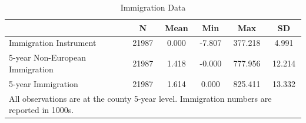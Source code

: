 \begin{table}[htbp]\centering
\def\sym#1{\ifmmode^{#1}\else\(^{#1}\)\fi}
\caption{Immigration Data \label{tab:immigration}}
\begin{tabular}{l*{1}{ccccc}}
\toprule
                    &           N&        Mean&         Min&         Max&          SD\\
\midrule
Immigration Instrument&       21987&       0.000&      -7.807&     377.218&       4.991\\
5-year Non-European Immigration&       21987&       1.418&      -0.000&     777.956&      12.214\\
5-year Immigration  &       21987&       1.614&       0.000&     825.411&      13.332\\
\bottomrule
\multicolumn{6}{l}{\footnotesize All observations are at the county 5-year level. Immigration numbers are reported in 1000s.}\\
\end{tabular}
\end{table}
